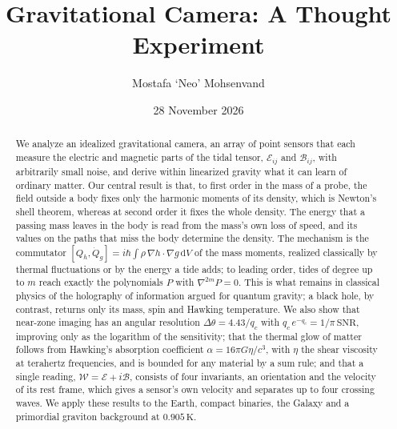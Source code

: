 \documentclass[aps,prd,twocolumn,nofootinbib,floatfix]{revtex4-2}
\begin{document}
\title{Gravitational Camera: A Thought Experiment}
\author{Mostafa ‘Neo’ Mohsenvand}
\date{28 November 2026}

\begin{abstract}
We analyze an idealized gravitational camera, an array of point sensors that
each measure the electric and magnetic parts of the tidal tensor,
$\mathcal{E}_{ij}$ and $\mathcal{B}_{ij}$, with arbitrarily small noise, and
derive within linearized gravity what it can learn of ordinary matter. Our
central result is that, to first order in the mass of a probe, the field
outside a body fixes only the harmonic moments of its density, which is
Newton's shell theorem, whereas at second order it fixes the whole density. The energy that a
passing mass leaves in the body is read from the mass's own loss of speed, and
its values on the paths that miss the body determine the density. The mechanism is the commutator
$[Q_h,\dot Q_g] = i\hbar\int\rho\,\nabla h\cdot\nabla g\,\mathrm{d}V$ of the
mass moments, realized classically by thermal fluctuations
or by the energy a tide adds; to leading order, tides of degree up to $m$ reach exactly
the polynomials $P$ with $\nabla^{2m}P = 0$. This is what remains in classical
physics of the holography of information argued for quantum gravity; a black
hole, by contrast, returns only its mass, spin and Hawking temperature. We also show
that near-zone imaging has
an angular resolution $\Delta\theta = 4.43/q_c$ with
$q_c\,e^{-q_c} = 1/\pi\,\mathrm{SNR}$, improving only as the logarithm of
the sensitivity; that the thermal glow of matter follows from Hawking's
absorption coefficient $\alpha = 16\pi G\eta/c^3$, with $\eta$ the shear
viscosity at terahertz frequencies, and is bounded for any material by a sum
rule; and that a single reading, $\mathcal{W} = \mathcal{E} + i\mathcal{B}$,
consists of four invariants, an orientation and the velocity of its rest frame,
which gives a sensor's own velocity and separates up to four crossing waves.
We apply these results to the Earth, compact binaries, the
Galaxy and a primordial graviton background at $0.905\,\mathrm{K}$.
\end{abstract}

\maketitle
















\appendix



\end{document}
